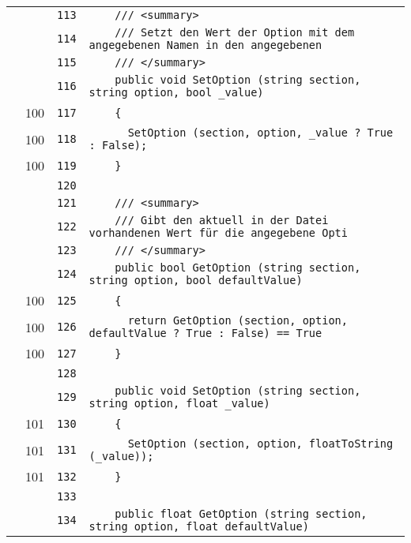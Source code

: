\documentclass[a4paper,10pt]{article}
\begin{document}
\begin{longtable}[l]{lrrl}
\cellcolor{gray} &  & \verb~113~ & \verb~    /// <summary>~\\
\cellcolor{gray} &  & \verb~114~ & \verb~    /// Setzt den Wert der Option mit dem angegebenen Namen in den angegebenen~\\
\cellcolor{gray} &  & \verb~115~ & \verb~    /// </summary>~\\
\cellcolor{gray} &  & \verb~116~ & \verb~    public void SetOption (string section, string option, bool _value)~\\
\cellcolor{green} & 100 & \verb~117~ & \verb~    {~\\
\cellcolor{green} & 100 & \verb~118~ & \verb~      SetOption (section, option, _value ? True : False);~\\
\cellcolor{green} & 100 & \verb~119~ & \verb~    }~\\
\cellcolor{gray} &  & \verb~120~ & \verb~~\\
\cellcolor{gray} &  & \verb~121~ & \verb~    /// <summary>~\\
\cellcolor{gray} &  & \verb~122~ & \verb~    /// Gibt den aktuell in der Datei vorhandenen Wert für die angegebene Opti~\\
\cellcolor{gray} &  & \verb~123~ & \verb~    /// </summary>~\\
\cellcolor{gray} &  & \verb~124~ & \verb~    public bool GetOption (string section, string option, bool defaultValue)~\\
\cellcolor{green} & 100 & \verb~125~ & \verb~    {~\\
\cellcolor{green} & 100 & \verb~126~ & \verb~      return GetOption (section, option, defaultValue ? True : False) == True ~\\
\cellcolor{green} & 100 & \verb~127~ & \verb~    }~\\
\cellcolor{gray} &  & \verb~128~ & \verb~~\\
\cellcolor{gray} &  & \verb~129~ & \verb~    public void SetOption (string section, string option, float _value)~\\
\cellcolor{green} & 101 & \verb~130~ & \verb~    {~\\
\cellcolor{green} & 101 & \verb~131~ & \verb~      SetOption (section, option, floatToString (_value));~\\
\cellcolor{green} & 101 & \verb~132~ & \verb~    }~\\
\cellcolor{gray} &  & \verb~133~ & \verb~~\\
\cellcolor{gray} &  & \verb~134~ & \verb~    public float GetOption (string section, string option, float defaultValue)~\\

\end{longtable}
\end{document}
